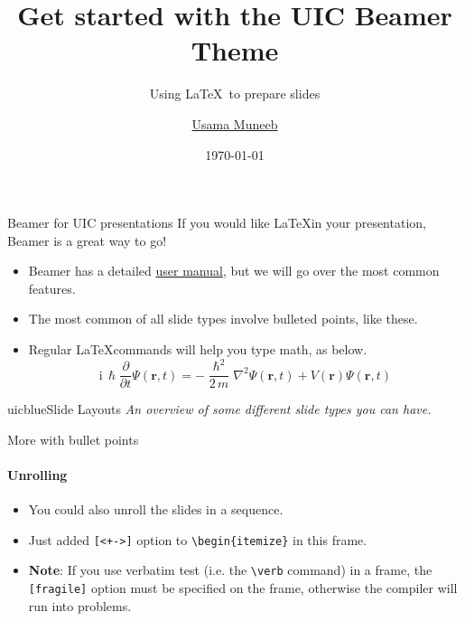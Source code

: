 \documentclass{beamer}
\title{Get started with the UIC Beamer Theme}
\subtitle{Using \LaTeX\ to prepare slides}
\author{\href{mailto:umunee2@uic.edu}{Usama Muneeb}}
\date{\today}
\newcommand{\hrefcol}[2]{\textcolor{uihteal}{\href{#1}{#2}}}
\begin{document}
\maketitle



\begin{frame}{Beamer for UIC presentations}
If you would like \LaTeX in your presentation, Beamer is a great way to go!
\begin{itemize}
\item Beamer has a detailed
\hrefcol{https://www.ctan.org/tex-archive/macros/latex/contrib/beamer/doc/beameruserguide.pdf}{user
 manual}, but we will go over the most common features.
\item The most common of all slide types involve bulleted points, like these.
\item Regular \LaTeX commands will help you type math, as below.
\begin{equation*}
\mathrm{i}\,\hslash\frac{\partial}{\partial t} \Psi(\mathbf{r},t) = -\frac{\hslash^2}{2\,m}\nabla^2\Psi(\mathbf{r},t) + V(\mathbf{r})\Psi(\mathbf{r},t)
\end{equation*}
\end{itemize}
\end{frame}


\begin{chapter}{uicblue}{Slide Layouts}
\textit{An overview of some different slide types you can have.}
\end{chapter}


\begin{frame}[fragile]{More with bullet points}
\framesubtitle{Unrolling}
\begin{itemize}[<+->]
\item You could also unroll the slides in a sequence.
\item Just added \verb|[<+->]| option to \verb|\begin{itemize}| in this frame.
\item \textbf{Note}: If you use verbatim test (i.e. the \verb|\verb| command) in a frame, the \verb|[fragile]| option must be specified on the frame, otherwise the compiler will run into problems.
\end{itemize}
\end{frame}
\end{document}
